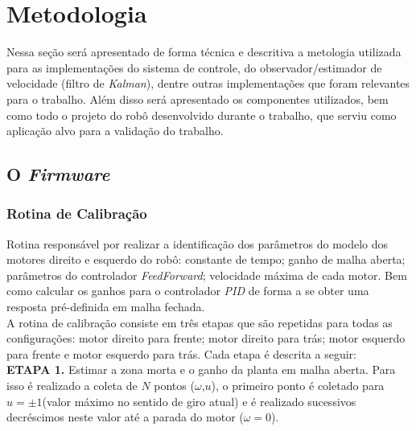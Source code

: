 \chapter[Metodologia]{Metodologia}
\label{ch:metodologia}

Nessa seção será apresentado de forma técnica e descritiva a metologia utilizada para as implementações do sistema de controle, do observador/estimador de velocidade (filtro de \emph{Kalman}), dentre outras implementações que foram relevantes para o trabalho. Além disso será apresentado os componentes utilizados, bem como todo o projeto do robô desenvolvido durante o trabalho, que serviu como aplicação alvo para a validação do trabalho.



\section{O \emph{Firmware}}

\subsection{Rotina de Calibração}

Rotina responsável por realizar a identificação dos parâmetros do modelo dos motores direito e esquerdo do robô: constante de tempo; ganho de malha aberta; parâmetros do controlador \emph{FeedForward}; velocidade máxima de cada motor. Bem como calcular os ganhos para o controlador \emph{PID} de forma a se obter uma resposta pré-definida em malha fechada.\\

A rotina de calibração consiste em três etapas que são repetidas para todas as configurações: motor direito para frente; motor direito para trás; motor esquerdo para frente e motor esquerdo para trás. Cada etapa é descrita a seguir: \\


\textbf{ETAPA 1.} Estimar a zona morta e o ganho da planta em malha aberta. Para isso é realizado a coleta de $N$ pontos ($\omega$,$u$), o primeiro ponto é coletado para $u = \pm1$(valor máximo no sentido de giro atual) e é realizado sucessivos decréscimos neste valor até a parada do motor ($\omega = 0$). \\

